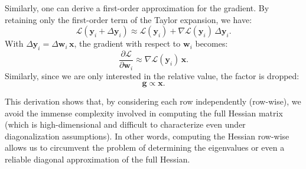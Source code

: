 Similarly, one can derive a first-order approximation for the gradient. By retaining only the first-order term of the Taylor expansion, we have:
\begin{equation}
\mathcal{L}(\mathbf{y}_i + \Delta \mathbf{y}_i) \approx \mathcal{L}(\mathbf{y}_i) + \nabla \mathcal{L}(\mathbf{y}_i)\, \Delta \mathbf{y}_i.
\end{equation}
With \(\Delta \mathbf{y}_i = \Delta \mathbf{w}_i \, \mathbf{x}\), the gradient with respect to \(\mathbf{w}_i\) becomes:
\begin{equation}
\frac{\partial \mathcal{L}}{\partial \mathbf{w}_i} \approx \nabla \mathcal{L}(\mathbf{y}_i)\, \mathbf{x}.
\end{equation}
Similarly, since we are only interested in the relative value, the factor is dropped:
\begin{equation}
\mathbf{g} \propto \mathbf{x}.
\end{equation}

This derivation shows that, by considering each row independently (row-wise), we avoid the immense complexity involved in computing the full Hessian matrix (which is high-dimensional and difficult to characterize even under diagonalization assumptions). In other words, computing the Hessian row-wise allows us to circumvent the problem of determining the eigenvalues or even a reliable diagonal approximation of the full Hessian.



